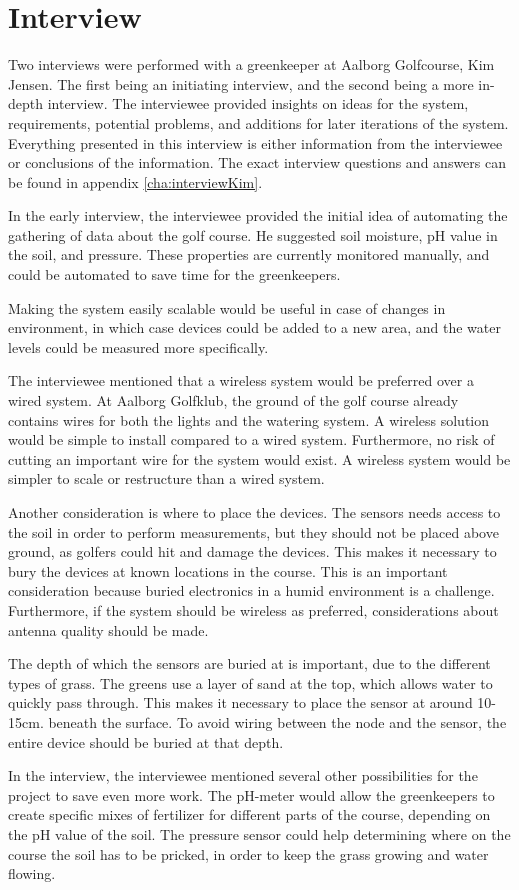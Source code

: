 \section{Interview}
Two interviews were performed with a greenkeeper at Aalborg Golfcourse, Kim Jensen. The first being an initiating interview, and the second being a more in-depth interview. The interviewee provided insights on ideas for the system, requirements, potential problems, and additions for later iterations of the system. Everything presented in this interview is either information from the interviewee or conclusions of the information. The exact interview questions and answers can be found in appendix \ref{cha:interviewKim}. 

In the early interview, the interviewee provided the initial idea of automating the gathering of data about the golf course. He suggested soil moisture, pH value in the soil, and pressure. These properties are currently monitored manually, and could be automated to save time for the greenkeepers.

Making the system easily scalable would be useful in case of changes in environment, in which case devices could be added to a new area, and the water levels could be measured more specifically.

The interviewee mentioned that a wireless system would be preferred over a wired system. At Aalborg Golfklub, the ground of the golf course already contains wires for both the lights and the watering system. A wireless solution would be simple to install compared to a wired system. Furthermore, no risk of cutting an important wire for the system would exist. A wireless system would be simpler to scale or restructure than a wired system.

Another consideration is where to place the devices. The sensors needs access to the soil in order to perform measurements, but they should not be placed above ground, as golfers could hit and damage the devices. This makes it necessary to bury the devices at known locations in the course. This is an important consideration because buried electronics in a humid environment is a challenge. Furthermore, if the system should be wireless as preferred, considerations about antenna quality should be made.

The depth of which the sensors are buried at is important, due to the different types of grass. The greens use a layer of sand at the top, which allows water to quickly pass through. This makes it necessary to place the sensor at around 10-15cm. beneath the surface. To avoid wiring between the node and the sensor, the entire device should be buried at that depth.

In the interview, the interviewee mentioned several other possibilities for the project to save even more work. The pH-meter would allow the greenkeepers to create specific mixes of fertilizer for different parts of the course, depending on the pH value of the soil. The pressure sensor could help determining where on the course the soil has to be pricked, in order to keep the grass growing and water flowing.